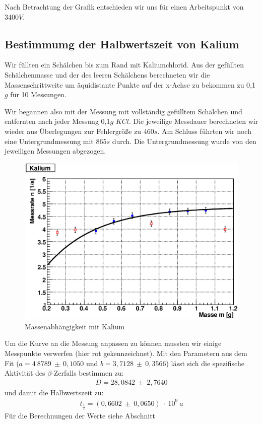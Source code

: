 \documentclass[12pt]{article}
\begin{document}
Nach Betrachtung der Grafik entschieden wir uns für einen Arbeitspunkt von 3400$V$.

\subsection{Bestimmumg der Halbwertszeit von Kalium}
Wir füllten ein Schälchen bis zum Rand mit Kaliumchlorid. Aus der gefüllten Schälchenmasse und der des leeren Schälchens berechneten wir die Massenschrittweite um äquidistante Punkte auf der x-Achse zu bekommen zu 0,1$g$ für 10 Messungen.

Wir begannen also mit der Messung mit vollständig gefülltem Schälchen und entfernten nach jeder Messung 0,1$g$ $KCl$. Die jeweilige Messdauer berechneten wir wieder aus Überlegungen zur Fehlergröße zu 460$s$. Am Schluss führten wir noch eine Untergrundmessung mit 865$s$ durch. Die Untergrundmessung wurde von den jeweiligen Messungen abgezogen.

\begin{figure}[H]  
\centering
\includegraphics[width=0.9\linewidth]{pictures/kalium.eps}
\caption{Massenabhängigkeit mit Kalium}
\end{figure}

Um die Kurve an die Messung anpassen zu können mussten wir einige Messpunkte verwerfen (hier rot gekennzeichnet).
Mit den Parametern aus dem Fit ($a = 4~8789~\pm~0,1050$ und $b = 3,7128~\pm~0,3566$) lässt sich die spezifische Aktivität des $\beta$-Zerfalls bestimmen zu:
\begin{align*}
 D = 28,0842~\pm~2,7640
\end{align*}
und damit die Halbwertszeit zu:
\begin{align*}
 t_{\frac{1}{2}} = (0,6602~\pm~0,0650)~\cdot~10^9~a
\end{align*}
Für die Berechnungen der Werte siehe Abschnitt %
\newpage
\end{document}
